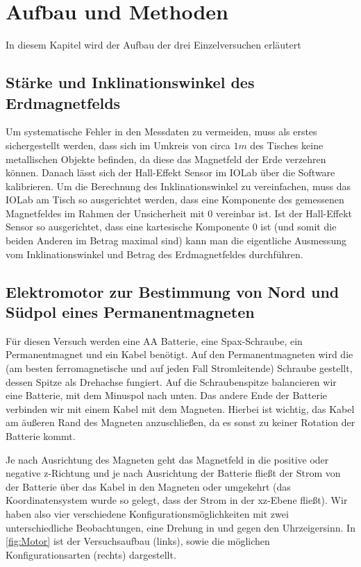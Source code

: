 
\section{Aufbau und Methoden}
\label{sec:aufbau}

In diesem Kapitel wird der Aufbau der drei Einzelversuchen erläutert

\subsection{Stärke und Inklinationswinkel des Erdmagnetfelds}
\label{sec:Erdmagnetfeld}
Um systematische Fehler in den Messdaten zu vermeiden, muss als erstes sichergestellt werden, dass sich im Umkreis von circa \( 1 \unit{m} \) des Tisches keine metallischen Objekte befinden, da diese das Magnetfeld der Erde verzehren können. Danach lässt sich der Hall-Effekt Sensor im IOLab über die Software kalibrieren.
Um die Berechnung des Inklinationswinkel zu vereinfachen, muss das IOLab am Tisch so ausgerichtet werden, dass eine Komponente des gemessenen Magnetfeldes im Rahmen der Unsicherheit mit \( 0 \) vereinbar ist. Ist der Hall-Effekt Sensor so ausgerichtet, dass eine kartesische Komponente 0 ist (und somit die beiden Anderen im Betrag maximal sind) kann man die eigentliche Ausmessung vom Inklinationswinkel und Betrag des Erdmagnetfeldes durchführen.

\subsection{Elektromotor zur Bestimmung von Nord und Südpol eines Permanentmagneten} 
Für diesen Versuch werden eine AA Batterie, eine Spax-Schraube, ein Permanentmagnet und ein Kabel benötigt. Auf den Permanentmagneten wird die (am besten ferromagnetische und auf jeden Fall Stromleitende) Schraube gestellt, dessen Spitze als Drehachse fungiert. Auf die Schraubenspitze balancieren wir eine Batterie, mit dem Minuspol nach unten. Das andere Ende der Batterie verbinden wir mit einem Kabel mit dem Magneten. Hierbei ist wichtig, das Kabel am äußeren Rand des Magneten anzuschließen, da es sonst zu keiner Rotation der Batterie kommt.

Je nach Ausrichtung des Magneten geht das Magnetfeld in die positive oder negative z-Richtung und je nach Ausrichtung der Batterie fließt der Strom von der Batterie über das Kabel in den Magneten oder umgekehrt (das Koordinatensystem wurde so gelegt, dass der Strom in der xz-Ebene fließt). Wir haben also vier verschiedene Konfigurationsmöglichkeiten mit zwei unterschiedliche Beobachtungen, eine Drehung in und gegen den Uhrzeigersinn. In \autoref{fig:Motor} ist der Versuchsaufbau (links), sowie die möglichen Konfigurationsarten (rechts) dargestellt.

